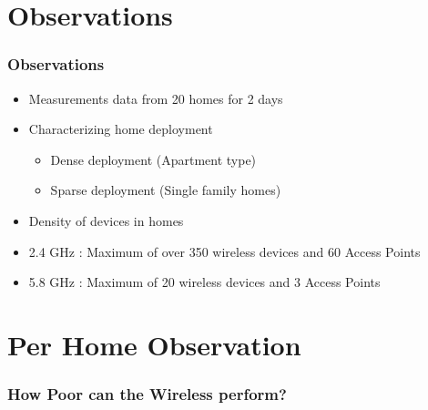 \documentclass{beamer}
\begin{document}
\section{Observations}
\begin{frame}
  \frametitle{Observations}
    \begin{itemize} 
    \item Measurements data from 20 homes for 2 days    
    \item Characterizing home deployment
       \begin{itemize}
         \item Dense deployment (Apartment type)
         \item Sparse deployment (Single family homes)
       \end{itemize}
    \item Density of devices in homes
     \item 2.4 GHz : Maximum of over 350 wireless devices and 60 Access Points
     \item 5.8 GHz : Maximum of 20 wireless devices and 3 Access Points
    \end{itemize}
\end{frame}
\section{Per Home Observation}
\begin{frame}
  \frametitle{How Poor can the Wireless perform?}
\end{frame}
\end{document}
